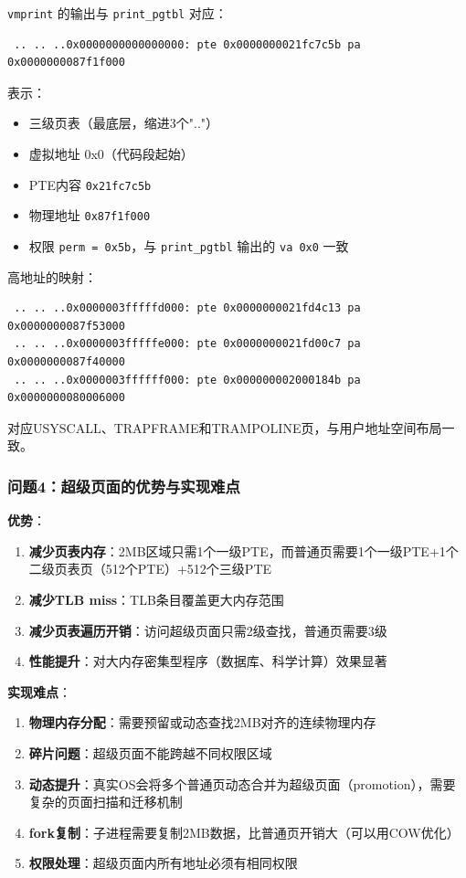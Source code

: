 \texttt{vmprint} 的输出与 \texttt{print\_pgtbl} 对应：

\begin{lstlisting}
 .. .. ..0x0000000000000000: pte 0x0000000021fc7c5b pa 0x0000000087f1f000
\end{lstlisting}

表示：
\begin{itemize}
    \item 三级页表（最底层，缩进3个".."）
    \item 虚拟地址 0x0（代码段起始）
    \item PTE内容 \texttt{0x21fc7c5b}
    \item 物理地址 \texttt{0x87f1f000}
    \item 权限 \texttt{perm = 0x5b}，与 \texttt{print\_pgtbl} 输出的 \texttt{va 0x0} 一致
\end{itemize}

高地址的映射：

\begin{lstlisting}
 .. .. ..0x0000003fffffd000: pte 0x0000000021fd4c13 pa 0x0000000087f53000
 .. .. ..0x0000003fffffe000: pte 0x0000000021fd00c7 pa 0x0000000087f40000
 .. .. ..0x0000003ffffff000: pte 0x000000002000184b pa 0x0000000080006000
\end{lstlisting}

对应USYSCALL、TRAPFRAME和TRAMPOLINE页，与用户地址空间布局一致。

\subsubsection{问题4：超级页面的优势与实现难点}

\textbf{优势}：
\begin{enumerate}
    \item \textbf{减少页表内存}：2MB区域只需1个一级PTE，而普通页需要1个一级PTE+1个二级页表页（512个PTE）+512个三级PTE
    \item \textbf{减少TLB miss}：TLB条目覆盖更大内存范围
    \item \textbf{减少页表遍历开销}：访问超级页面只需2级查找，普通页需要3级
    \item \textbf{性能提升}：对大内存密集型程序（数据库、科学计算）效果显著
\end{enumerate}

\textbf{实现难点}：
\begin{enumerate}
    \item \textbf{物理内存分配}：需要预留或动态查找2MB对齐的连续物理内存
    \item \textbf{碎片问题}：超级页面不能跨越不同权限区域
    \item \textbf{动态提升}：真实OS会将多个普通页动态合并为超级页面（promotion），需要复杂的页面扫描和迁移机制
    \item \textbf{fork复制}：子进程需要复制2MB数据，比普通页开销大（可以用COW优化）
    \item \textbf{权限处理}：超级页面内所有地址必须有相同权限
\end{enumerate}

